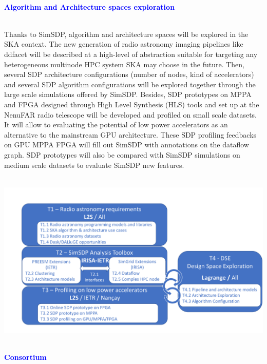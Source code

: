 \documentclass{beamer}
\renewenvironment{block}[1]{%
\begin{Sbox}%
\begin{minipage}[t]{\textwidth}
~\\
\textcolor{blue}{\quad #1}~\\
~\\%
\vspace{0.5cm}
} 
{%
\end{minipage}
\end{Sbox}\Ovalbox{\TheSbox}%
}
\begin{document}
{\begin{columns}[t]
\begin{column}{.49\linewidth}
\begin{block}{\large \textbf{Algorithm and Architecture spaces exploration}}
        \begin{minipage}{0.95\textwidth}
Thanks to SimSDP, algorithm and architecture spaces will be explored in the SKA context. The new generation of radio astronomy imaging pipelines like ddfacet will be described at a high-level of abstraction suitable for targeting any heterogeneous multinode HPC system SKA may choose in the future. Then, several SDP architecture configurations (number of nodes, kind of accelerators) and several SDP algorithm configurations will be explored together through the large scale simulations offered by SimSDP. Besides, SDP prototypes on MPPA and FPGA designed through High Level Synthesis (HLS) tools and set up at the NenuFAR radio telescope will be developed and profiled on small scale datasets. It will allow to evaluating the potential of low power accelerators as an alternative to the mainstream GPU architecture. These SDP profiling feedbacks on GPU MPPA FPGA will fill out SimSDP with annotations on the dataflow graph. SDP prototypes will also be compared with SimSDP simulations on medium scale datasets to evaluate SimSDP new features.\\


 \\
 \begin{center}
    \includegraphics[width=\textwidth ]{Tasks} %
    \end{center}




\end{minipage}

\end{block}

\begin{block}{\large \textbf{Consortium}}
 

\end{block}
\end{column}
\end{columns}}
\end{document}
